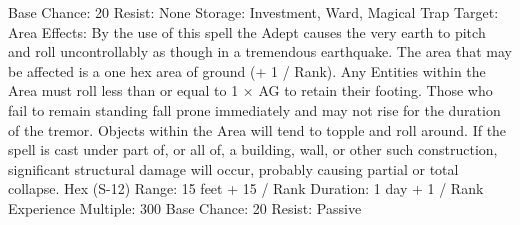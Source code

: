 \documentclass[a4paper]{article}
\begin{document}
\begin{multicols}{3}
Base Chance: 20%
Resist: None
Storage: Investment, Ward, Magical Trap
Target: Area
Effects: By the use of this spell the Adept causes
the very earth to pitch and roll uncontrollably as
though in a tremendous earthquake. The area that
may be affected is a one hex area of ground (+ 1 /
Rank). Any Entities within the Area must roll less
than or equal to 1 × AG to retain their footing.
Those who fail to remain standing fall prone immediately and may not rise for the duration of the
tremor. Objects within the Area will tend to topple
and roll around. If the spell is cast under part of, or
all of, a building, wall, or other such construction,
significant structural damage will occur, probably
causing partial or total collapse.
Hex (S-12)
Range: 15 feet + 15 / Rank
Duration: 1 day + 1 / Rank
Experience Multiple: 300
Base Chance: 20%
Resist: Passive


\end{multicols}
\end{document}
